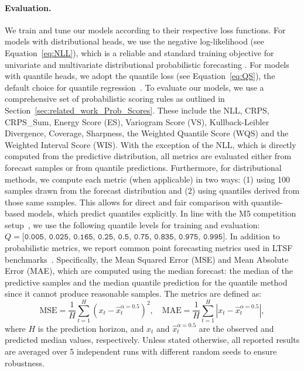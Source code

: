 \documentclass[a4paper,oneside,bibliography=totoc]{scrbook}
\begin{document}
\paragraph{Evaluation.}
We train and tune our models according to their respective loss functions. For models with distributional heads, we use the negative log-likelihood (see Equation~\ref{eq:NLL}), which is a reliable and standard training objective for univariate and multivariate distributional probabilistic forecasting \cite{marcotte_regions_2023}. 
For models with quantile heads, we adopt the quantile loss (see Equation~\ref{eq:QS}), the default choice for quantile regression~\cite{koenker_regression_1978, koenker_quantile_2005}.
To evaluate our models, we use a comprehensive set of probabilistic scoring rules as outlined in Section~\ref{sec:related_work_Prob_Scores}. These include the NLL, CRPS, CRPS\_Sum, Energy Score (ES), Variogram Score (VS), Kullback-Leibler Divergence, Coverage, Sharpness, the Weighted Quantile Score (WQS) and the Weighted Interval Score (WIS). With the exception of the NLL, which is directly computed from the predictive distribution, all metrics are evaluated either from forecast samples or from quantile predictions.
Furthermore, for distributional methods, we compute each metric (when applicable) in two ways: (1) using 100 samples drawn from the forecast distribution and (2) using quantiles derived from those same samples. This allows for direct and fair comparison with quantile-based models, which predict quantiles explicitly.
In line with the M5 competition setup~\cite{makridakis_m5_2022, chen_evaluating_2022}, we use the following quantile levels for training and evaluation: $Q = \texttt{[0.005, 0.025, 0.165, 0.25, 0.5, 0.75, 0.835, 0.975, 0.995]}$.
In addition to probabilistic metrics, we report common point forecasting metrics used in LTSF benchmarks~\cite{nie_time_2022, jia_witran_2023, liu_itransformer_2023}. Specifically, the Mean Squared Error (MSE) and Mean Absolute Error (MAE), which are computed using the median forecast: the median of the predictive samples and the median quantile prediction for the quantile method since it cannot produce reasonable samples. The metrics are defined as:
\begin{equation}
    \text{MSE} = \frac{1}{H}\sum_{t=1}^H(x_t - \hat{x}_t^{\alpha=0.5})^2, \quad 
    \text{MAE} = \frac{1}{H}\sum_{t=1}^H |x_t - \hat{x}_t^{\alpha=0.5}|,
\end{equation}
where \(H\) is the prediction horizon, and \(x_t\) and \(\hat{x}_t^{\alpha=0.5}\) are the observed and predicted median values, respectively.
Unless stated otherwise, all reported results are averaged over 5 independent runs with different random seeds to ensure robustness.
\end{document}
